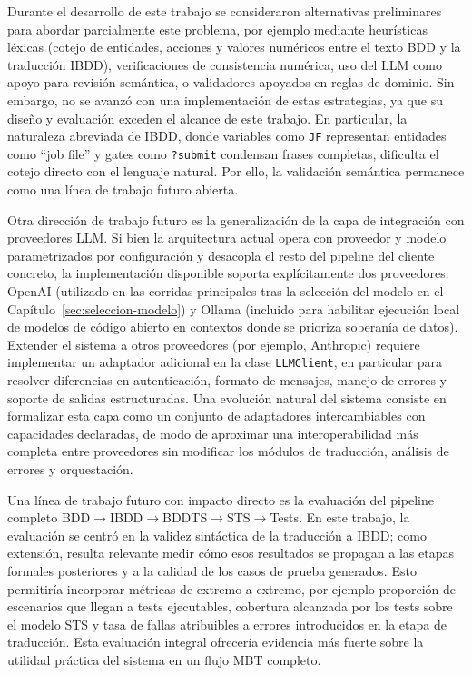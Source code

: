 Durante el desarrollo de este trabajo se consideraron alternativas preliminares para abordar parcialmente este problema, por ejemplo mediante heurísticas léxicas (cotejo de entidades, acciones y valores numéricos entre el texto BDD y la traducción IBDD), verificaciones de consistencia numérica, uso del LLM como apoyo para revisión semántica, o validadores apoyados en reglas de dominio. Sin embargo, no se avanzó con una implementación de estas estrategias, ya que su diseño y evaluación exceden el alcance de este trabajo. En particular, la naturaleza abreviada de IBDD, donde variables como \texttt{JF} representan entidades como ``job file'' y gates como \texttt{?submit} condensan frases completas, dificulta el cotejo directo con el lenguaje natural. Por ello, la validación semántica permanece como una línea de trabajo futuro abierta.

Otra dirección de trabajo futuro es la generalización de la capa de integración con proveedores LLM. Si bien la arquitectura actual opera con proveedor y modelo parametrizados por configuración y desacopla el resto del pipeline del cliente concreto, la implementación disponible soporta explícitamente dos proveedores: OpenAI (utilizado en las corridas principales tras la selección del modelo en el Capítulo~\ref{sec:seleccion-modelo}) y Ollama (incluido para habilitar ejecución local de modelos de código abierto en contextos donde se prioriza soberanía de datos). Extender el sistema a otros proveedores (por ejemplo, Anthropic) requiere implementar un adaptador adicional en la clase \texttt{LLMClient}, en particular para resolver diferencias en autenticación, formato de mensajes, manejo de errores y soporte de salidas estructuradas. Una evolución natural del sistema consiste en formalizar esta capa como un conjunto de adaptadores intercambiables con capacidades declaradas, de modo de aproximar una interoperabilidad más completa entre proveedores sin modificar los módulos de traducción, análisis de errores y orquestación.

Una línea de trabajo futuro con impacto directo es la evaluación del pipeline completo BDD$\rightarrow$IBDD$\rightarrow$BDDTS$\rightarrow$STS$\rightarrow$Tests. En este trabajo, la evaluación se centró en la validez sintáctica de la traducción a IBDD; como extensión, resulta relevante medir cómo esos resultados se propagan a las etapas formales posteriores y a la calidad de los casos de prueba generados. Esto permitiría incorporar métricas de extremo a extremo, por ejemplo proporción de escenarios que llegan a tests ejecutables, cobertura alcanzada por los tests sobre el modelo STS y tasa de fallas atribuibles a errores introducidos en la etapa de traducción. Esta evaluación integral ofrecería evidencia más fuerte sobre la utilidad práctica del sistema en un flujo MBT completo.

